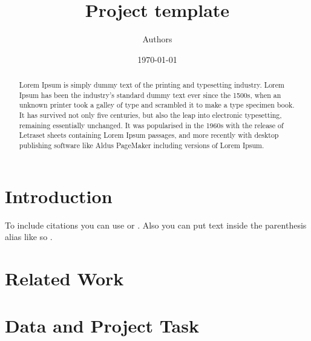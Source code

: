 \documentclass{article}
\title{Project template}
\author{Authors}
\date{\today}
\begin{document}
\maketitle
\newpage

\tableofcontents
\newpage

\begin{abstract}
    Lorem Ipsum is simply dummy text of the printing and typesetting industry. Lorem Ipsum has been the industry's standard dummy text ever since the 1500s, when an unknown printer took a galley of type and scrambled it to make a type specimen book. It has survived not only five centuries, but also the leap into electronic typesetting, remaining essentially unchanged. It was popularised in the 1960s with the release of Letraset sheets containing Lorem Ipsum passages, and more recently with desktop publishing software like Aldus PageMaker including versions of Lorem Ipsum.
\end{abstract}
\newpage


\section{Introduction}
\label{sec:introduction}

To include citations you can use \citet{GaiaDR22018} or \citep{GaiaDR22018}. Also you can put text inside the parenthesis alias like so \citet[][; Table 3]{GaiaDR22018}.

\section{Related Work}
\label{sec:related_work}


\section{Data and Project Task}
\label{sec:data_and_project_tasks}
\end{document}
